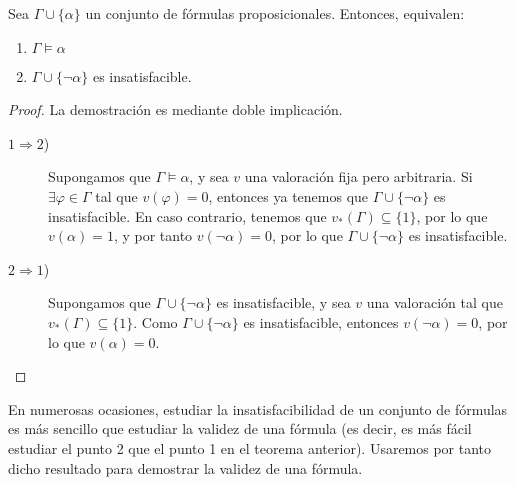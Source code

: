 \begin{teo}
    Sea $\Gamma\cup \{\alpha\}$ un conjunto de fórmulas proposicionales. Entonces, equivalen:
    \begin{enumerate}
        \item $\Gamma\vDash \alpha$
        \item $\Gamma\cup \{\lnot \alpha\}$ es insatisfacible.
    \end{enumerate}

    \begin{proof}
        La demostración es mediante doble implicación.
        \begin{description}
            \item[$1\Longrightarrow 2$)] Supongamos que $\Gamma\vDash \alpha$, y sea $v$ una valoración fija pero arbitraria.
            Si $\exists \varphi\in \Gamma$ tal que $v(\varphi)=0$, entonces ya tenemos que $\Gamma \cup \{\lnot \alpha\}$ es insatisfacible.
            En caso contrario, tenemos que $v_\ast(\Gamma)\subseteq \{1\}$, por lo que $v(\alpha)=1$, y por tanto $v(\lnot \alpha)=0$, por lo que $\Gamma\cup \{\lnot \alpha\}$ es insatisfacible.

            \item[$2\Longrightarrow 1$)] Supongamos que $\Gamma\cup \{\lnot \alpha\}$ es insatisfacible,
            y sea $v$ una valoración tal que $v_\ast(\Gamma)\subseteq \{1\}$.
            Como $\Gamma\cup \{\lnot \alpha\}$ es insatisfacible, entonces $v(\lnot \alpha)=0$, por lo que $v(\alpha)=0$.
        \end{description}
    \end{proof}
\end{teo}
\begin{observacion}
    En numerosas ocasiones, estudiar la insatisfacibilidad de un conjunto de fórmulas es más sencillo que estudiar la validez de una fórmula
    (es decir, es más fácil estudiar el punto 2 que el punto 1 en el teorema anterior). Usaremos por tanto dicho resultado para demostrar la validez de una fórmula.
\end{observacion}


